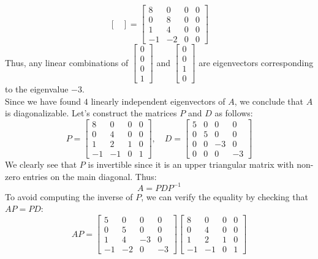\begin{eg}
\[\begin{bmatrix}
    \end{bmatrix} = \begin{bmatrix}
        8 & 0 & 0 & 0 \\ 0 & 8 & 0 & 0 \\ 1 & 4 & 0 & 0 \\ -1 & -2 & 0 & 0
    \end{bmatrix}\]
    Thus, any linear combinations of $\begin{bmatrix}
        0 \\ 0 \\ 0 \\ 1
    \end{bmatrix}$ and $\begin{bmatrix}
        0 \\ 0 \\ 1 \\ 0
    \end{bmatrix}$ are eigenvectors corresponding to the eigenvalue $-3$. \\
    Since we have found $4$ linearly independent eigenvectors of $A$, we conclude that $A$ is diagonalizable. Let's construct the matrices $P$ and $D$ as follows:
    \[P = \begin{bmatrix}
        8 & 0 & 0 & 0 \\ 0 & 4 & 0 & 0 \\ 1 & 2 & 1 & 0 \\ -1 & -1 & 0 & 1
    \end{bmatrix}, \quad D = \begin{bmatrix}
        5 & 0 & 0 & 0 \\ 0 & 5 & 0 & 0 \\ 0 & 0 & -3 & 0 \\ 0 & 0 & 0 & -3
    \end{bmatrix}\]
    We clearly see that $P$ is invertible since it is an upper triangular matrix with non-zero entries on the main diagonal. Thus:
    \[
        A = P D P^{-1}
    \]
    To avoid computing the inverse of $P$, we can verify the equality by checking that $A P = P D$:
    \[A P = \begin{bmatrix}
        5 & 0 & 0 & 0 \\ 0 & 5 & 0 & 0 \\ 1 & 4 & -3 & 0 \\ -1 & -2 & 0 & -3
    \end{bmatrix} \begin{bmatrix}
        8 & 0 & 0 & 0 \\ 0 & 4 & 0 & 0 \\ 1 & 2 & 1 & 0 \\ -1 & -1 & 0 & 1

\end{bmatrix}\]
\end{eg}
